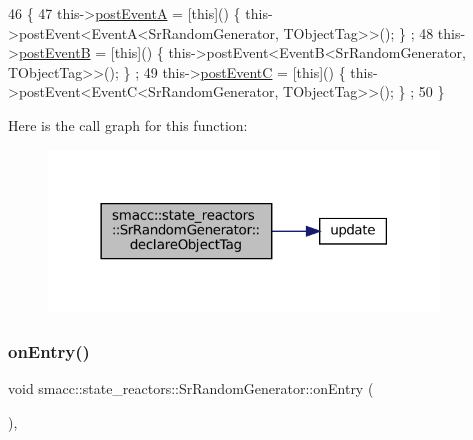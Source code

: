 \begin{DoxyCode}
46     \{
47         this->\hyperlink{classsmacc_1_1state__reactors_1_1SrRandomGenerator_ac157de4b848ebc5da1acb593f7b25108}{postEventA} = [\textcolor{keyword}{this}]() \{ this->postEvent<EventA<SrRandomGenerator, TObjectTag>>(); \}
      ;
48         this->\hyperlink{classsmacc_1_1state__reactors_1_1SrRandomGenerator_a0b38db23bf80e0709c2ae51c6a64ac1c}{postEventB} = [\textcolor{keyword}{this}]() \{ this->postEvent<EventB<SrRandomGenerator, TObjectTag>>(); \}
      ;
49         this->\hyperlink{classsmacc_1_1state__reactors_1_1SrRandomGenerator_a1aeb07de7b52a9f5811e5f60444731a0}{postEventC} = [\textcolor{keyword}{this}]() \{ this->postEvent<EventC<SrRandomGenerator, TObjectTag>>(); \}
      ;
50     \}
\end{DoxyCode}
Here is the call graph for this function\+:
\nopagebreak
\begin{figure}[H]
\begin{center}
\leavevmode
\includegraphics[width=294pt]{classsmacc_1_1state__reactors_1_1SrRandomGenerator_a3c8db60268bcffc709a482f2cf302d41_cgraph}
\end{center}
\end{figure}
\mbox{\label{classsmacc_1_1state__reactors_1_1SrRandomGenerator_a093fa3de1ca4f84c74cc0cb0f093cb31}} 
\subsubsection{\texorpdfstring{on\+Entry()}{onEntry()}}
{\footnotesize\ttfamily void smacc\+::state\+\_\+reactors\+::\+Sr\+Random\+Generator\+::on\+Entry (\begin{DoxyParamCaption}{ }\end{DoxyParamCaption})\hspace{0.3cm}{\ttfamily [override]}, {\ttfamily [virtual]}}



